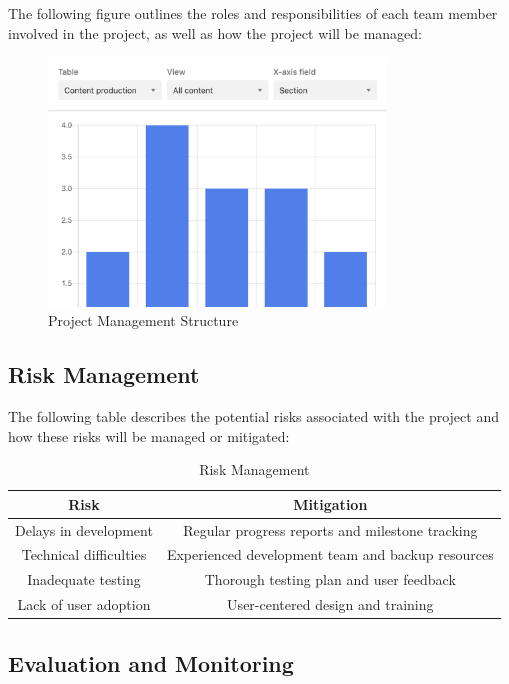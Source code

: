 \documentclass{article}
\begin{document}
The following figure outlines the roles and responsibilities of each team member involved in the project, as well as how the project will be managed:

\begin{figure}[htbp]
\centering
\includegraphics[width=0.8\textwidth]{project_management.png}
\caption{Project Management Structure}
\label{fig:management}
\end{figure}

\subsection{Risk Management}

The following table describes the potential risks associated with the project and how these risks will be managed or mitigated:

\begin{table}[htbp]
\centering
\caption{Risk Management}
\begin{tabular}{|c|c|}
\hline
\textbf{Risk} & \textbf{Mitigation} \\
\hline
Delays in development & Regular progress reports and milestone tracking \\
Technical difficulties & Experienced development team and backup resources \\
Inadequate testing & Thorough testing plan and user feedback \\
Lack of user adoption & User-centered design and training \\
\hline
\end{tabular}%
\label{tab:risk}%
\end{table}%

\subsection{Evaluation and Monitoring}
\end{document}

